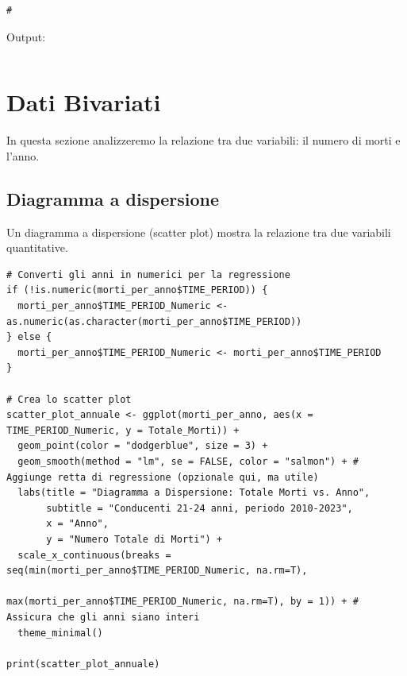 \documentclass[14pt, openany, titlepage]{report} %
\begin{document}
\begin{center}
\begin{lstlisting}[breaklines=true]
#
\end{lstlisting}
\end{center}

\noindent
Output:
\begin{verbatim}

\end{verbatim}

\section{Dati Bivariati}
In questa sezione analizzeremo la relazione tra due variabili: il numero di morti e l'anno.

\subsection{Diagramma a dispersione}
Un diagramma a dispersione (scatter plot) mostra la relazione tra due variabili quantitative.

\begin{center}
\begin{lstlisting}[breaklines=true]
# Converti gli anni in numerici per la regressione
if (!is.numeric(morti_per_anno$TIME_PERIOD)) {
  morti_per_anno$TIME_PERIOD_Numeric <- as.numeric(as.character(morti_per_anno$TIME_PERIOD))
} else {
  morti_per_anno$TIME_PERIOD_Numeric <- morti_per_anno$TIME_PERIOD
}

# Crea lo scatter plot
scatter_plot_annuale <- ggplot(morti_per_anno, aes(x = TIME_PERIOD_Numeric, y = Totale_Morti)) +
  geom_point(color = "dodgerblue", size = 3) +
  geom_smooth(method = "lm", se = FALSE, color = "salmon") + # Aggiunge retta di regressione (opzionale qui, ma utile)
  labs(title = "Diagramma a Dispersione: Totale Morti vs. Anno",
       subtitle = "Conducenti 21-24 anni, periodo 2010-2023",
       x = "Anno",
       y = "Numero Totale di Morti") +
  scale_x_continuous(breaks = seq(min(morti_per_anno$TIME_PERIOD_Numeric, na.rm=T),
                                  max(morti_per_anno$TIME_PERIOD_Numeric, na.rm=T), by = 1)) + # Assicura che gli anni siano interi
  theme_minimal()

print(scatter_plot_annuale)
\end{lstlisting}
\end{center}
\end{document}
